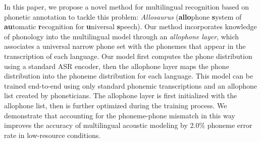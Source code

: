 \documentclass{article}
\begin{document}





In this paper, we propose a novel method for multilingual recognition based on phonetic annotation to tackle this problem: \textit{Allosaurus} (\textbf{allo}phone \textbf{s}ystem of \textbf{au}tomatic \textbf{r}ecognition for \textbf{u}niversal \textbf{s}peech).
Our method incorporates knowledge of phonology into the multilingual model through an \textit{allophone layer}, which associates a universal narrow phone set with the phonemes that appear in the transcription of each language.
Our model first computes the phone distribution using a standard ASR encoder, then the allophone layer maps the phone distribution into the phoneme distribution for each language.
This model can be trained end-to-end using only standard phonemic transcriptions and an allophone list created by phoneticians.
The allophone layer is first initialized with the allophone list, then is further optimized during the training process.
We demonstrate that accounting for the phoneme-phone mismatch in this way improves the accuracy of multilingual acoustic modeling by 2.0\% phoneme error rate in low-resource conditions.
\end{document}
